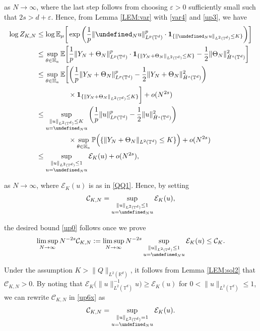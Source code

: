 \documentclass[letterpaper, 11pt,  reqno]{amsart}
\newcommand{\noi}{\noindent}
\newcommand{\R}{\mathbb{R}}
\newcommand{\T}{\mathbb{T}}
\let\P= \undefined
\newcommand{\P}{\mathbf{P}}
\newcommand{\E}{\mathbb{E}}
\newcommand{\eps}{\varepsilon}
\newcommand{\ind}{\mathbf 1}
\newcommand{\EE}{\mathcal{E}}
\numberwithin{equation}{section}
\numberwithin{theorem}{section}
\newcommand{\PP}{\mathbb{P}}
\newcommand{\CC}{\mathcal{C}}
\newcommand{\dr}{\theta}
\newcommand{\Dr}{\Theta}
\renewcommand{\u}{\vec{u}}
\begin{document}
\noi
as $N \to \infty$, 
where the last step follows from choosing $\eps > 0$ sufficiently small
such that $2s > d  + \eps$.
Hence, 
from Lemma \ref{LEM:var} with \eqref{var4} and \eqref{up3}, 
we have 
\begin{align}
\log  Z_{K, N}
& \le \log \E_{\mu}\bigg[
\exp\bigg( \frac 1 p\| \P_N u \|_{L^p(\T^d)}^p \cdot \ind_{\{ \| \P_N u \|_{L^2 (\mathbb{T}^d)}\leq K \}}  \bigg)\bigg]\notag\\
&  \le \sup_{\dr\in \mathbb{H}_a}\E\bigg[
\frac{1}{p}\|Y_N+\Dr_N\|^p_{L^p(\T^d)} \cdot 
\ind_{\{\|Y_N+\Dr_N\|_{L^2(\T^d)}\le K\}}-\frac{1}{2}\|\Dr_N \|_{\dot H^s(\T^d)}^2\bigg]\notag \\
& \le \sup_{\dr\in \mathbb{H}_a}\E\bigg[\bigg(
\frac{1}{p}\|Y_N+\Dr_N\|^p_{L^p(\T^d)}
-\frac{1}{2}\|Y_N+\Dr_N\|^2_{\dot H^{s}(\T^d)}\bigg) \notag \\
& \hphantom{XXXXX}
\times  \ind_{\{\|Y_N+\Dr_N\|_{L^2(\T^d)}\le K\}}\bigg]+o(N^{2s})
\label{up4}
\\
& \le \sup_{\substack{ \|u\|_{L^2(\T^d)}\le K\\u = \P_N u\\}}
\bigg(\frac{1}{p}\|u\|_{L^p(\T^d)}^p-\frac{1}{2}\|u\|^2_{\dot H^{s}(\T^d)}\bigg)\notag \\
& \hphantom{XXXXX}
 \times \sup_{\theta \in \mathbb{H}_a} \PP \Big(\{ \| Y_N +
\Theta_N \|_{L^2 (\mathbb{T}^d)} \leq K \}\Big) +o(N^{2s})\notag \\
& \le \sup_{\substack{  \|u\|_{L^2(\T^d)}\le 1\\u = \P_N u}}
\EE_K(u)
+o(N^{2s}), \notag
\end{align}


\noi
as $N \to \infty$, 
where $\EE_K(u)$ is as in \eqref{QQ1}.
Hence, 
by setting
\begin{align}
\CC_{K,N}
 = 
 \sup_{\substack{\|u\|_{L^2(\T^d)}\le 1\\u = \P_N u}}
\EE_K(u), 
\label{up6x}
\end{align}

\noi
the desired bound
\eqref{up0} follows 
once we prove
\begin{align}
\limsup_{N\to \infty}N^{-2s}\CC_{K,N}
: = 
\limsup_{N\to \infty}N^{-2s}  \sup_{\substack{\|u\|_{L^2(\T^d)}\le 1\\u = \P_N u}}
\EE_K(u)
\le \CC_K.
\label{up6}
\end{align}




Under the assumption $K>\|Q\|_{L^{2}(\R^d)}$, 
it follows from 
 Lemma \ref{LEM:sol2}
that $\CC_{K, N} > 0$. 
By noting that $\EE_K\big(\|u\|_{L^2(\T^d)}^{-1} u \big) 
\ge \EE_{K}(u)$ for 
$0 < \|u\|_{L^2(\T^d)} \le 1$, we can rewrite $\CC_{K, N}$ in \eqref{up6x} as 
\begin{align}
\CC_{K,N}=\sup_{\substack{\|u\|_{L^2(\T^d)}= 1\\u = \P_N u}}
\EE_{K}(u). 
\label{up7}
\end{align}
\end{document}
